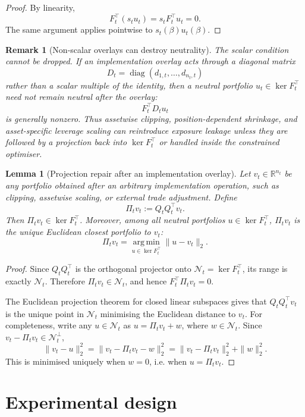 \documentclass[11pt]{article}
\newtheorem{lemma}{Lemma}
\newtheorem{remark}{Remark}
\newcommand{\R}{\mathbb{R}}
\newcommand{\N}{\mathcal{N}}
\newcommand{\argmin}{\operatorname*{arg\,min}}
\begin{document}
\begin{proof}
By linearity,
\[
        F_t^\top(s_tu_t)=s_tF_t^\top u_t=0.
\]
The same argument applies pointwise to $s_t(\beta)u_t(\beta)$.
\end{proof}

\begin{remark}[Non-scalar overlays can destroy neutrality]
The scalar condition cannot be dropped.  If an implementation overlay acts through a diagonal matrix
\[
        D_t=\operatorname{diag}(d_{1,t},\ldots,d_{n_t,t})
\]
rather than a scalar multiple of the identity, then a neutral portfolio $u_t\in\ker F_t^\top$ need not
remain neutral after the overlay:
\[
        F_t^\top D_tu_t
\]
is generally nonzero.  Thus assetwise clipping, position-dependent shrinkage, and asset-specific leverage
scaling can reintroduce exposure leakage unless they are followed by a projection back into
$\ker F_t^\top$ or handled inside the constrained optimiser.
\end{remark}

\begin{lemma}[Projection repair after an implementation overlay]
\label{lem:projection-repair}
Let $v_t\in\R^{n_t}$ be any portfolio obtained after an arbitrary implementation operation, such as
clipping, assetwise scaling, or external trade adjustment.  Define
\[
        \Pi_t v_t := Q_tQ_t^\top v_t.
\]
Then $\Pi_t v_t\in\ker F_t^\top$.  Moreover, among all neutral portfolios $u\in\ker F_t^\top$,
$\Pi_t v_t$ is the unique Euclidean closest portfolio to $v_t$:
\[
        \Pi_t v_t=\argmin_{u\in\ker F_t^\top}\|u-v_t\|_2.
\]
\end{lemma}

\begin{proof}
Since $Q_tQ_t^\top$ is the orthogonal projector onto $\N_t=\ker F_t^\top$, its range is exactly
$\N_t$.  Therefore $\Pi_t v_t\in\N_t$, and hence $F_t^\top \Pi_t v_t=0$.

The Euclidean projection theorem for closed linear subspaces gives that $Q_tQ_t^\top v_t$ is the
unique point in $\N_t$ minimising the Euclidean distance to $v_t$.  For completeness, write any
$u\in\N_t$ as $u=\Pi_t v_t+w$, where $w\in\N_t$.  Since $v_t-\Pi_t v_t\in\N_t^\perp$,
\[
        \|v_t-u\|_2^2
        =\|v_t-\Pi_t v_t-w\|_2^2
        =\|v_t-\Pi_t v_t\|_2^2+\|w\|_2^2.
\]
This is minimised uniquely when $w=0$, i.e. when $u=\Pi_t v_t$.
\end{proof}

\section{Experimental design}
\end{document}
